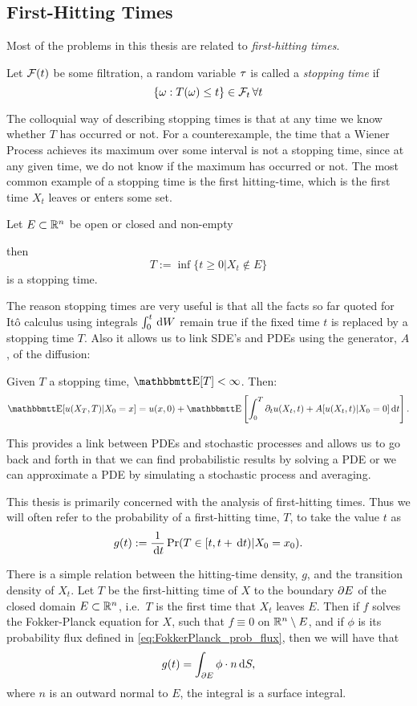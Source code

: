 \subsection{First-Hitting Times}
Most of the problems in this thesis are related to {\sl first-hitting times}.

\begin{defn}
Let ${\mathcal{F}}(t)$ be some filtration, a random variable ${\tau}$ is called a
\emph{stopping time} if 
$$
\{{\omega} : T({\omega}) \leq t\} \in {\mathcal{F}}_t \, \forall t  
$$
\end{defn}
The colloquial way of describing stopping times is that at any time we know
whether $T$ has occurred or not. For a counterexample, the time that a Wiener
Process achieves its maximum over some interval is not a stopping time, since at any
given time, we do not know if the maximum has occurred or not. The most common
example of a stopping time is the first hitting-time, which is the first time
$X_t$ leaves or enters some set. 
\begin{thm} Let $E \subset { \mathbb{R} }^n$ be open or closed and non-empty
 
then $$T := \inf\{ t \geq 0 | X_t \notin E\}$$ is a stopping time.
\end{thm}
 
The reason stopping times are very useful is that all the facts so far quoted
for It\^o calculus using integrals $\int_0^t \, \mathrm{d} W$ remain true if the
fixed time $t$ is replaced by a stopping time $T$. Also it allows us to link
SDE's and PDEs using the generator, $A$, of the diffusion: 
\begin{thm} Given $T$ a stopping time, $\Exp[T] < \infty$.
Then:
$$
\Exp[u(X_T, T) | X_0 =x] =
u(x, 0) + \Exp\left[\int_0^T \di_t u(X_t, t) + A[u(X_t,t) | X_0=0] \intd{t}
\right].
 $$
\end{thm}
This provides a link between PDEs and stochastic processes and allows us to go
back and forth in that we can find probabilistic results by
solving a PDE or we can approximate a PDE by simulating a stochastic process
and averaging.

This thesis is primarily concerned with the analysis of first-hitting times.
Thus we will often refer to the probability of a first-hitting time, $T$, to
take the value $t$ as
$$g(t) := \frac{1}{\, \mathrm{d} t} \Pr(T \in [t, t+\, \mathrm{d} t) |X_0 = x_0).$$

There is a simple relation between the hitting-time density, $g$, and the
transition density of $X_t$. Let $T$ be the first-hitting time of $X$ to the
boundary ${\partial} E$ of the closed domain $E\subset  { \mathbb{R} }^n$, i.e.\ $T$ is the first
time that $X_t$ leaves $E$.  
Then if $f$ solves the
Fokker-Planck equation for $X$, such that $f\equiv 0$ on ${ \mathbb{R} }^n \setminus E$, and
if $\phi$ is its probability flux defined in \cref{eq:FokkerPlanck_prob_flux}, then
we will have that
\begin{equation}
g(t) = \int_{{\partial} E} \phi \cdot n \, \mathrm{d} S,
\label{eq:hitting_time_g_in_terms_of_outflow}
\end{equation}
where $n$ is an outward normal to $E$, the integral is a surface integral. 

